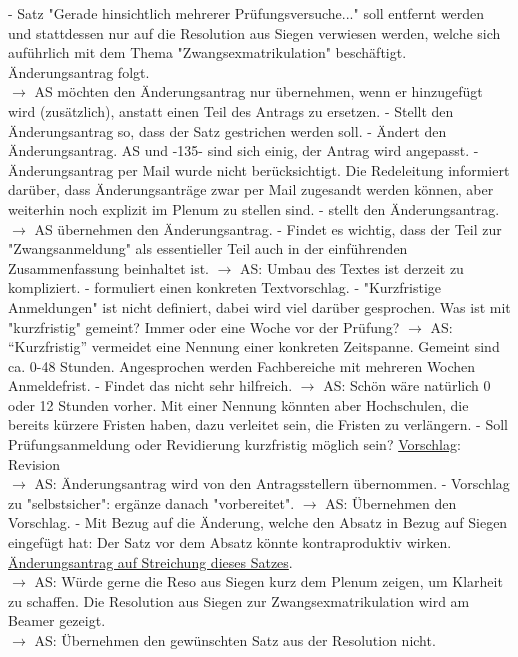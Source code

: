     \begin{outline}
      - Satz "Gerade hinsichtlich mehrerer Prüfungsversuche..." soll entfernt werden und stattdessen nur auf die Resolution aus Siegen verwiesen werden, welche sich auführlich mit dem Thema "Zwangsexmatrikulation" beschäftigt. \\ Änderungsantrag folgt. \\
      $\rightarrow$ AS möchten den Änderungsantrag nur übernehmen, wenn er hinzugefügt wird (zusätzlich), anstatt einen Teil des Antrags zu ersetzen.
        - Stellt den Änderungsantrag so, dass der Satz gestrichen werden soll.
        - Ändert den Änderungsantrag. AS und -135- sind sich einig, der Antrag wird angepasst.
      - Änderungsantrag per Mail wurde nicht berücksichtigt.
        \2 Die Redeleitung informiert darüber, dass Änderungsanträge zwar per Mail zugesandt werden können, aber weiterhin noch explizit im Plenum zu stellen sind.
      - stellt den Änderungsantrag. $\rightarrow$ AS übernehmen den Änderungsantrag.
      - Findet es wichtig, dass der Teil zur "Zwangsanmeldung" als essentieller Teil auch in der einführenden Zusammenfassung beinhaltet ist.
        $\rightarrow$ AS: Umbau des Textes ist derzeit zu kompliziert.
        - formuliert einen konkreten Textvorschlag.
      - "Kurzfristige Anmeldungen" ist nicht definiert, dabei wird viel darüber gesprochen. Was ist mit "kurzfristig" gemeint? Immer oder eine Woche vor der Prüfung? $\rightarrow$ AS: ``Kurzfristig'' vermeidet eine Nennung einer konkreten Zeitspanne. Gemeint sind ca. 0-48 Stunden. Angesprochen werden Fachbereiche mit mehreren Wochen Anmeldefrist.
        - Findet das nicht sehr hilfreich.
          $\rightarrow$ AS: Schön wäre natürlich 0 oder 12 Stunden vorher. Mit einer Nennung könnten aber Hochschulen, die bereits kürzere Fristen haben, dazu verleitet sein, die Fristen zu verlängern.
      - Soll Prüfungsanmeldung oder Revidierung kurzfristig möglich sein? \underline{Vorschlag}: Revision \\
        $\rightarrow$ AS: Änderungsantrag wird von den Antragsstellern übernommen.
      - Vorschlag zu "selbstsicher": ergänze danach "vorbereitet". $\rightarrow$ AS: Übernehmen den Vorschlag.
      - Mit Bezug auf die Änderung, welche den Absatz in Bezug auf Siegen eingefügt hat: Der Satz vor dem Absatz könnte kontraproduktiv wirken. \underline{Änderungsantrag auf Streichung dieses Satzes}. \\
      $\rightarrow$ AS: Würde gerne die Reso aus Siegen kurz dem Plenum zeigen, um Klarheit zu schaffen.
      \1 Die Resolution aus Siegen zur Zwangsexmatrikulation wird am Beamer gezeigt. \\
      $\rightarrow$ AS: Übernehmen den gewünschten Satz aus der Resolution nicht.
    \end{outline}

